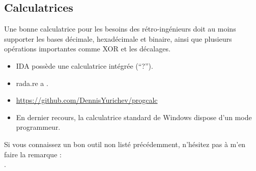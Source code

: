 \subsection{Calculatrices}

Une bonne calculatrice pour les besoins des rétro-ingénieurs doit au moins supporter
les bases décimale, hexadécimale et binaire, ainsi que plusieurs opérations importantes
comme XOR et les décalages.

\begin{itemize}

\item IDA possède une calculatrice intégrée (``?'').

\item rada.re a .

\item \url{https://github.com/DennisYurichev/progcalc}

\item En dernier recours, la calculatrice standard de Windows dispose d'un mode
programmeur.

\end{itemize}


Si vous connaissez un bon outil non listé précédemment, n'hésitez pas à m'en faire la remarque : \\
\TT{\EMAIL}.

